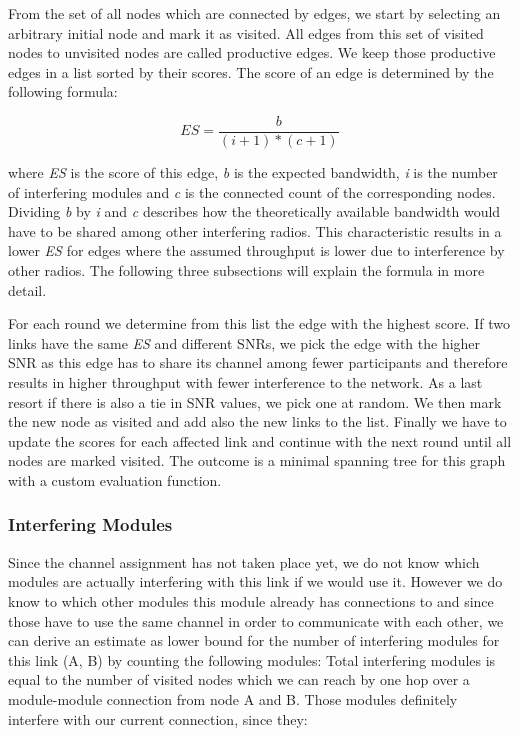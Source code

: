       From the set of all nodes which are connected by edges, we start by selecting an arbitrary initial node and mark it as visited. 
      All edges from this set of visited nodes to unvisited nodes are called productive edges.
      We keep those productive edges in a list sorted by their scores. The score of an edge is determined by the following formula:
      
      \begin{equation} \label{eq:edgescore}
	ES=\frac{b}{(i + 1 )* (c + 1)}
      \end{equation}
      
      where \textit{ES} is the score of this edge, \textit{b} is the expected bandwidth, \textit{i} is the number of 
      interfering modules and \textit{c} is the connected count of the corresponding nodes. 
      Dividing \textit{b} by \textit{i} and \textit{c} describes how the theoretically available bandwidth would have to be shared among other interfering radios.
      This characteristic results in a lower \textit{ES} for edges where the assumed throughput is lower due to interference by other radios.
      The following three subsections will explain the formula in more detail.
      
      For each round we determine from this list the edge with the highest score. If two links have the same \textit{ES} and different SNRs, we pick the edge with
      the higher \ac{SNR} as this edge has to share its channel among fewer participants and therefore results in higher throughput with fewer interference to the network.
      As a last resort if there is also a tie in \ac{SNR} values, we pick one at random. We then mark the new node as visited and add also the new links to the list.
      Finally we have to update the scores for each affected link and continue with the next round until all nodes are marked visited.
      The outcome is a minimal spanning tree for this graph with a custom evaluation function.
      
\newpage
      
      \subsubsection{Interfering Modules}
	Since the channel assignment has not taken place yet, we do not know which modules are actually interfering with this link if we would use it.
	However we do know to which other modules this module already has connections to and since those have to use the same channel in order to communicate with each
	other, we can derive an estimate as lower bound for the number of interfering modules for this link (A, B) by counting the following modules:
	Total interfering modules is equal to the number of visited nodes which we can reach by one hop over a module-module connection from node A and B.
	Those modules definitely interfere with our current connection, since they:
	
